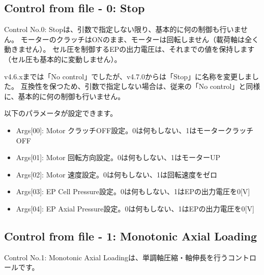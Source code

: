 \subsection{Control from file - 0: Stop}
Control No.0: Stopは、引数で指定しない限り、基本的に何の制御も行いません。
モーターのクラッチはONのまま、モーターは回転しません（載荷軸は全く動きません）。
セル圧を制御するEPの出力電圧は、それまでの値を保持します（セル圧も基本的に変動しません）。

v4.6.xまでは「No control」でしたが、v4.7.0からは「Stop」に名称を変更しました。
互換性を保つため、引数で指定しない場合は、従来の「No control」と同様に、基本的に何の制御も行いません。

以下のパラメータが設定できます。
\begin{itemize}
    \item Args[00]: Motor クラッチOFF設定。0は何もしない、1はモータークラッチOFF
    \item Args[01]: Motor 回転方向設定。0は何もしない、1はモーターUP
    \item Args[02]: Motor 速度設定。0は何もしない、1は回転速度をゼロ
    \item Args[03]: EP Cell Pressure設定。0は何もしない、1はEPの出力電圧を0[V]
    \item Args[04]: EP Axial Pressure設定。0は何もしない、1はEPの出力電圧を0[V]
\end{itemize}

\subsection{Control from file - 1: Monotonic Axial Loading}
Control No.1: Monotonic Axial Loadingは、単調軸圧縮・軸伸長を行うコントロールです。

